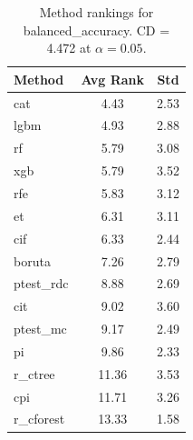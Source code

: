 \begin{table}[h]
\centering
\caption{Method rankings for balanced_accuracy. CD = 4.472 at $\alpha=0.05$.}
\label{tab:ranks_balanced_accuracy}
\begin{tabular}{lcc}
\toprule
Method & Avg Rank & Std \\
\midrule
cat & 4.43 & 2.53 \\
lgbm & 4.93 & 2.88 \\
rf & 5.79 & 3.08 \\
xgb & 5.79 & 3.52 \\
rfe & 5.83 & 3.12 \\
et & 6.31 & 3.11 \\
cif & 6.33 & 2.44 \\
boruta & 7.26 & 2.79 \\
ptest_rdc & 8.88 & 2.69 \\
cit & 9.02 & 3.60 \\
ptest_mc & 9.17 & 2.49 \\
pi & 9.86 & 2.33 \\
r_ctree & 11.36 & 3.53 \\
cpi & 11.71 & 3.26 \\
r_cforest & 13.33 & 1.58 \\
\bottomrule
\end{tabular}
\end{table}